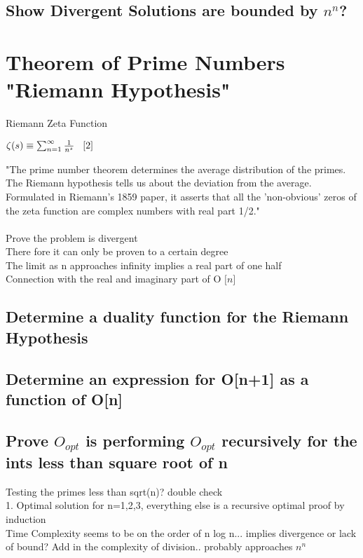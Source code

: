 \documentclass[11pt]{article}
\begin{document}
\subsection{Show Divergent Solutions are bounded by $n^n$?}









\newpage
\section{Theorem of Prime Numbers "Riemann Hypothesis"}
Riemann Zeta Function
\begin{center}
$
\zeta (s) \equiv \sum_{n=1}^{\infty} \frac{1}{n^s} \hspace{3mm} \lbrack 2 \rbrack
$
\end{center}
"The prime number theorem determines the average distribution of the primes. The Riemann hypothesis tells us about the deviation from the average. Formulated in Riemann's 1859 paper, it asserts that all the 'non-obvious' zeros of the zeta function are complex numbers with real part 1/2." \rbrack\\
\\
Prove the problem is divergent\\
There fore it can only be proven to a certain degree\\
The limit as n approaches infinity implies a real part of one half\\
Connection with the real and imaginary part of O $\lbrack n \rbrack$

\subsection{Determine a duality function for the Riemann Hypothesis}
\subsection{Determine an expression for O[n+1] as a function of O[n]}

\subsection{Prove $O_{opt}$ is performing $O_{opt}$ recursively for the ints less than square root of n}
Testing the primes less than sqrt(n)? double check \\
1. Optimal solution for n=1,2,3, everything else is a recursive optimal proof by induction\\
Time Complexity seems to be on the order of n log n... implies divergence or lack of bound? Add in the complexity of division.. probably approaches $n^n$
\end{document}

